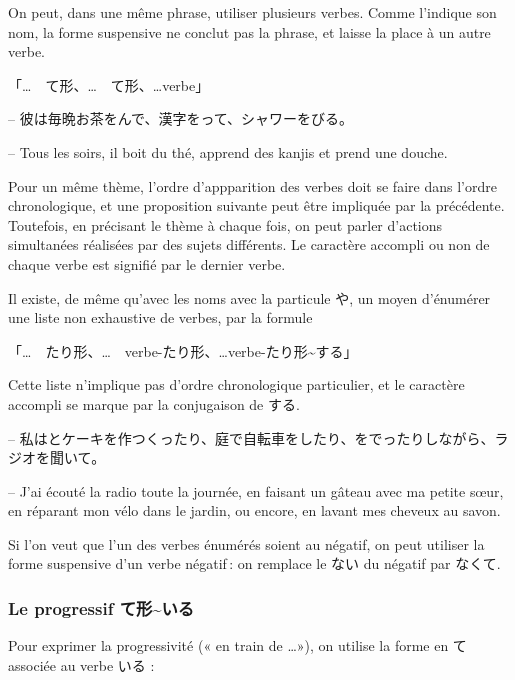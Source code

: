 On peut, dans une même phrase, utiliser plusieurs verbes. Comme l'indique son nom, la forme suspensive ne conclut pas la phrase, et laisse la place à un autre verbe.
\begin{center}
    「\dots　て形、\dots　て形、\dots verbe」
\end{center}
\begin{tcolorbox}
    -- 彼は毎晩お茶をんで、漢字をって、シャワーをびる。

    -- Tous les soirs, il boit du thé, apprend des kanjis et prend une douche.
\end{tcolorbox}

Pour un même thème, l'ordre d'appparition des verbes doit se faire dans l'ordre chronologique, et une proposition suivante peut être impliquée par la précédente. Toutefois, en précisant le thème à chaque fois, on peut parler d'actions simultanées réalisées par des sujets différents. Le caractère accompli ou non de chaque verbe est signifié par le dernier verbe.

Il existe, de même qu'avec les noms avec la particule や, un moyen d'énumérer une liste non exhaustive de verbes, par la formule
\begin{center}
    「\dots　たり形、\dots　verbe-たり形、\dots verbe-たり形\~{}する」
\end{center}
Cette liste n'implique pas d'ordre chronologique particulier, et le caractère accompli se marque par la conjugaison de する.
\begin{tcolorbox}
    -- 私はとケーキを{作}{つく}ったり、庭で自転車をしたり、をでったりしながら、ラジオを聞いて。

    -- J'ai écouté la radio toute la journée, en faisant un gâteau avec ma petite sœur, en réparant mon vélo dans le jardin, ou encore, en lavant mes cheveux au savon.
\end{tcolorbox}

Si l'on veut que l'un des verbes énumérés soient au négatif, on peut utiliser la forme suspensive d'un verbe négatif : on remplace le ない du négatif par なくて.

\subsubsection{Le progressif て形\~{}いる}

Pour exprimer la progressivité (« en train de \dots »), on utilise la forme en て associée au verbe いる :

